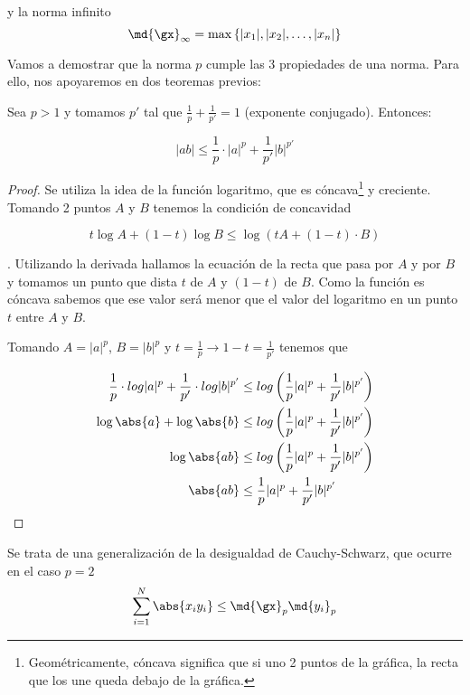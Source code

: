 \documentclass[a4paper,10pt]{apuntes}
\begin{document}
y la norma infinito 
\[\md{\gx}_{\infty} = \max\left\{|x_1|,|x_2|,\dots,|x_n|\right\} \]

 Vamos a demostrar que la norma $p$ cumple las 3 propiedades de una norma. Para ello, nos apoyaremos en dos teoremas previos:

\begin{theorem}
 Sea $p > 1$ y tomamos $p'$ tal que $\frac{1}{p}+\frac{1}{p'} = 1$ (exponente conjugado). Entonces:

\[ |ab| \leq \frac{1}{p} \cdot |a|^p +\frac{1}{p'} |b| ^ {p'} \]
\end{theorem}
 
\begin{proof}
Se utiliza la idea de la función logaritmo, que es cóncava\footnote{Geométricamente, cóncava significa que si uno 2 puntos de la gráfica, la recta que los une queda debajo de la gráfica.} y creciente.  Tomando 2 puntos $A$ y $B$ tenemos la condición de concavidad 

\[ t \log A + (1-t) \log B \leq \log (tA + (1-t) \cdot B)\]

. Utilizando la derivada hallamos la ecuación de la recta que pasa por $A$ y por $B$ y tomamos un punto que dista $t$ de $A$ y $(1-t)$ de $B$. Como la función es cóncava sabemos que ese valor será menor que el valor del logaritmo en un punto $t$ entre $A$ y $B$.

Tomando $A=|a| ^ p$, $B = |b| ^ p$ y $t = \frac{1}{p} \rightarrow 1-t = \frac{1}{p'}$ tenemos que

\begin{align*}
\frac{1}{p}\cdot log |a|^p + \frac{1}{p'} \cdot log|b|^{p'} &\leq log\left(\frac{1}{p}|a|^p + \frac{1}{p'} |b|^{p'}\right) \\
\log \abs{a} + \log \abs{b} &\leq log\left(\frac{1}{p}|a|^p + \frac{1}{p'} |b|^{p'}\right) \\
\log \abs{ab} &\leq log\left(\frac{1}{p}|a|^p + \frac{1}{p'} |b|^{p'}\right) \\
\abs{ab} &\leq \frac{1}{p}|a|^p + \frac{1}{p'} |b|^{p'} 
\end{align*}

\end{proof} 

\begin{theorem} Se trata de una generalización de la desigualdad de Cauchy-Schwarz, que ocurre en el caso $p=2$
\[ \sum_{i=1} ^ N \abs{x_i y_i} \leq \md{\gx}_p \md{y_i}_p \]

\label{thmHolder}
\end{theorem}
\end{document}
